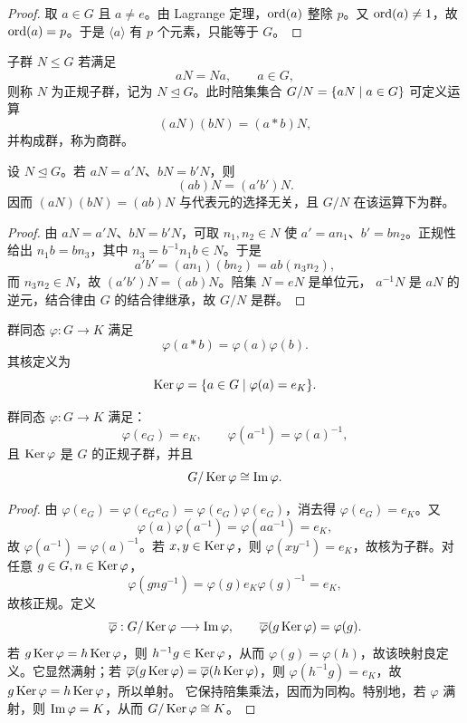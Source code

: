 \begin{proof}
  取 $a\in G$ 且 $a\ne e$。由 Lagrange 定理，$\operatorname{ord}(a)$ 整除 $p$。又 $\operatorname{ord}(a)\ne1$，故 $\operatorname{ord}(a)=p$。于是 $\langle a\rangle$ 有 $p$ 个元素，只能等于 $G$。
\end{proof}

\begin{definition}[正规子群与商群]\label{normal-quotient}
  子群 $N\le G$ 若满足
  \[
  aN=Na,\qquad a\in G,
  \]
  则称 $N$ 为正规子群，记为 $N\trianglelefteq G$。此时陪集集合 $G/N=\{aN\mid a\in G\}$ 可定义运算
  \[
  (aN)(bN)=(a*b)N,
  \]
  并构成群，称为商群。
\end{definition}

\begin{theorem}[商群运算的良定义性]\label{quotient-well-defined}
  设 $N\trianglelefteq G$。若 $aN=a'N$、$bN=b'N$，则
  \[
  (ab)N=(a'b')N.
  \]
  因而 $(aN)(bN)=(ab)N$ 与代表元的选择无关，且 $G/N$ 在该运算下为群。
\end{theorem}

\begin{proof}
  由 $aN=a'N$、$bN=b'N$，可取 $n_1,n_2\in N$ 使
  $a'=an_1$、$b'=bn_2$。正规性给出 $n_1b=bn_3$，其中
  $n_3=b^{-1}n_1b\in N$。于是
  \[
  a'b'=(an_1)(bn_2)=ab(n_3n_2),
  \]
  而 $n_3n_2\in N$，故 $(a'b')N=(ab)N$。陪集 $N=eN$ 是单位元，
  $a^{-1}N$ 是 $aN$ 的逆元，结合律由 $G$ 的结合律继承，故 $G/N$ 是群。
\end{proof}

\begin{definition}[群同态与核]\label{group-hom-kernel}
  群同态 $\varphi:G\to K$ 满足
  \[
  \varphi(a*b)=\varphi(a)\varphi(b).
  \]
  其核定义为
  \[
  \operatorname{Ker}\varphi=\{a\in G\mid \varphi(a)=e_K\}.
  \]
\end{definition}

\begin{theorem}[群同态基本性质]\label{group-hom-laws}
  群同态 $\varphi:G\to K$ 满足：
  \[
  \varphi(e_G)=e_K,\qquad \varphi(a^{-1})=\varphi(a)^{-1},
  \]
  且 $\operatorname{Ker}\varphi$ 是 $G$ 的正规子群，并且
  \[
  G/\operatorname{Ker}\varphi\cong\operatorname{Im}\varphi.
  \]
\end{theorem}

\begin{proof}
  由 $\varphi(e_G)=\varphi(e_Ge_G)=\varphi(e_G)\varphi(e_G)$，消去得 $\varphi(e_G)=e_K$。又
  \[
  \varphi(a)\varphi(a^{-1})=\varphi(aa^{-1})=e_K,
  \]
  故 $\varphi(a^{-1})=\varphi(a)^{-1}$。若 $x,y\in\operatorname{Ker}\varphi$，则 $\varphi(xy^{-1})=e_K$，故核为子群。对任意 $g\in G,n\in\operatorname{Ker}\varphi$，
  \[
  \varphi(gng^{-1})=\varphi(g)e_K\varphi(g)^{-1}=e_K,
  \]
  故核正规。定义
  \[
  \overline\varphi:G/\operatorname{Ker}\varphi\longrightarrow\operatorname{Im}\varphi,\qquad
  \overline\varphi(g\operatorname{Ker}\varphi)=\varphi(g).
  \]
  若 $g\operatorname{Ker}\varphi=h\operatorname{Ker}\varphi$，则 $h^{-1}g\in\operatorname{Ker}\varphi$，从而
  $\varphi(g)=\varphi(h)$，故该映射良定义。它显然满射；若
  $\overline\varphi(g\operatorname{Ker}\varphi)=\overline\varphi(h\operatorname{Ker}\varphi)$，则
  $\varphi(h^{-1}g)=e_K$，故 $g\operatorname{Ker}\varphi=h\operatorname{Ker}\varphi$，所以单射。
  它保持陪集乘法，因而为同构。特别地，若 $\varphi$ 满射，则
  $\operatorname{Im}\varphi=K$，从而 $G/\operatorname{Ker}\varphi\cong K$。
\end{proof}

